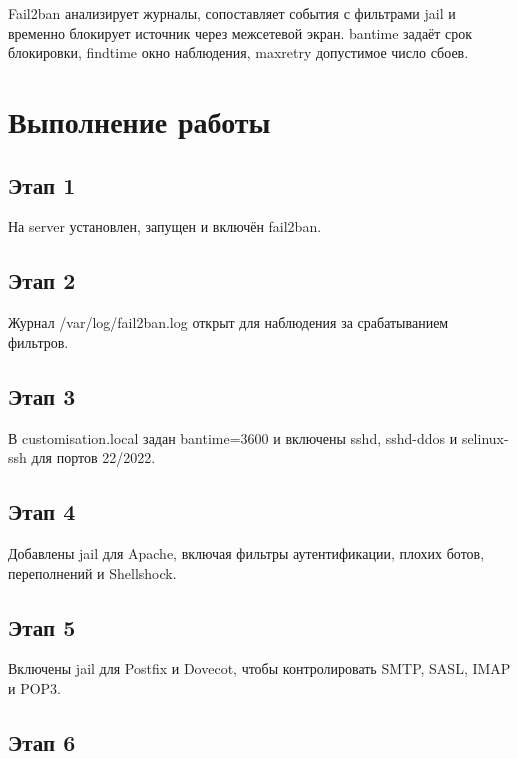 \documentclass[
  english,
  russian,
  12pt,
  a4paper,
  DIV=11,
  numbers=noendperiod]{scrreprt}
\begin{document}
Fail2ban анализирует журналы, сопоставляет события с фильтрами jail и
временно блокирует источник через межсетевой экран. bantime задаёт срок
блокировки, findtime окно наблюдения, maxretry допустимое число сбоев.

\chapter{Выполнение
работы}\label{ux432ux44bux43fux43eux43bux43dux435ux43dux438ux435-ux440ux430ux431ux43eux442ux44b}

\section{Этап 1}\label{ux44dux442ux430ux43f-1}

На server установлен, запущен и включён fail2ban.

\section{Этап 2}\label{ux44dux442ux430ux43f-2}

Журнал /var/log/fail2ban.log открыт для наблюдения за срабатыванием
фильтров.

\section{Этап 3}\label{ux44dux442ux430ux43f-3}

В customisation.local задан bantime=3600 и включены sshd, sshd-ddos и
selinux-ssh для портов 22/2022.

\section{Этап 4}\label{ux44dux442ux430ux43f-4}

Добавлены jail для Apache, включая фильтры аутентификации, плохих ботов,
переполнений и Shellshock.

\section{Этап 5}\label{ux44dux442ux430ux43f-5}

Включены jail для Postfix и Dovecot, чтобы контролировать SMTP, SASL,
IMAP и POP3.

\section{Этап 6}\label{ux44dux442ux430ux43f-6}
\end{document}
